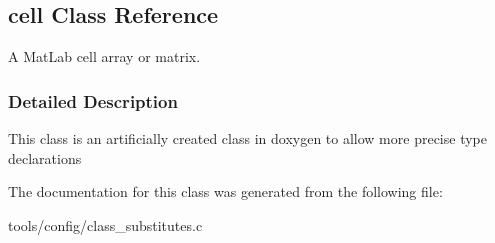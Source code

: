 \hypertarget{classcell}{}\subsection{cell Class Reference}
\label{classcell}


A Mat\+Lab cell array or matrix.  




\subsubsection{Detailed Description}
This class is an artificially created class in doxygen to allow more precise type declarations 

The documentation for this class was generated from the following file\+:\begin{DoxyCompactItemize}
\item 
tools/config/class\+\_\+substitutes.\+c\end{DoxyCompactItemize}
